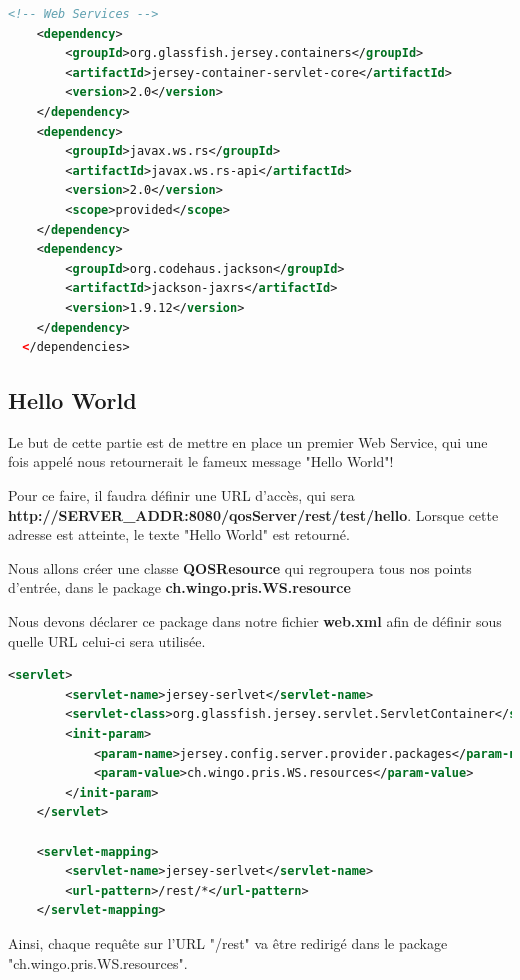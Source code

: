 \begin{lstlisting}[caption={Dépendances Maven pour Jersey}, language=XML]
<!-- Web Services -->
	<dependency>
		<groupId>org.glassfish.jersey.containers</groupId>
		<artifactId>jersey-container-servlet-core</artifactId>
		<version>2.0</version>
	</dependency>
	<dependency>
		<groupId>javax.ws.rs</groupId>
		<artifactId>javax.ws.rs-api</artifactId>
		<version>2.0</version>
		<scope>provided</scope>
	</dependency>
	<dependency>
		<groupId>org.codehaus.jackson</groupId>
		<artifactId>jackson-jaxrs</artifactId>
		<version>1.9.12</version>
	</dependency>	
  </dependencies>
\end{lstlisting}

\subsection{Hello World}

Le but de cette partie est de mettre en place un premier Web Service, qui une fois appelé nous retournerait le fameux message "Hello World"!

\medskip

Pour ce faire, il faudra définir une URL d'accès, qui sera \textbf{http://SERVER\_ADDR:8080/qosServer/rest/test/hello}. Lorsque cette adresse est atteinte, le texte "Hello World" est retourné.

Nous allons créer une classe \textbf{QOSResource} qui regroupera tous nos points d'entrée, dans le package \textbf{ch.wingo.pris.WS.resource}

\medskip

Nous devons déclarer ce package dans notre fichier \textbf{web.xml} afin de définir sous quelle URL celui-ci sera utilisée.

\begin{lstlisting}[language=XML, caption={Configuration web.xml pour Web Service}]
<servlet>
		<servlet-name>jersey-serlvet</servlet-name>
		<servlet-class>org.glassfish.jersey.servlet.ServletContainer</servlet-class>
		<init-param>
			<param-name>jersey.config.server.provider.packages</param-name>
			<param-value>ch.wingo.pris.WS.resources</param-value>
		</init-param>
	</servlet>

	<servlet-mapping>
		<servlet-name>jersey-serlvet</servlet-name>
		<url-pattern>/rest/*</url-pattern>
	</servlet-mapping>
\end{lstlisting}

Ainsi, chaque requête sur l'URL "/rest" va être redirigé dans le package "ch.wingo.pris.WS.resources".

